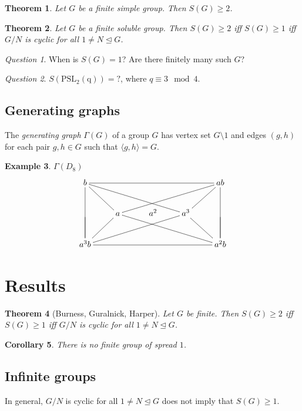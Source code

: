 \documentclass[svgnames]{article}
\newtheorem{Theorem}{Theorem}
\newtheorem{Corollary}[Theorem]{Corollary}
\theoremstyle{definition}
\newtheorem{Example}[Theorem]{Example}
\theoremstyle{remark}
\newtheorem{Question}{Question}
\begin{document}
\begin{Theorem}
Let $G$ be a finite simple group. Then $S(G) \ge 2$.
\end{Theorem}

\begin{Theorem}
Let $G$ be a finite soluble group. Then $S(G) \ge 2$ iff $S(G) \ge 1$ iff $G/N$ is cyclic for all $1 \ne N \unlhd G$.
\end{Theorem}

\begin{Question}
When is $S(G) = 1$? Are there finitely many such $G$?
\end{Question}

\begin{Question}
$S(\operatorname{PSL_2(q)}) = ?$, where $q \equiv 3 \mod 4$.
\end{Question}

\subsection{Generating graphs}
The \emph{generating graph} $\Gamma(G)$ of a group $G$ has vertex set $G\setminus1$ and edges $(g, h)$ for each pair $g, h \in G$ such that $\langle g, h \rangle = G$.
\begin{Example}$\Gamma(D_8)$
\begin{equation*}
\xymatrix{
	b \ar@{-}[dd] \ar@{-}[rd] \ar@{-}[rrrd] \ar@{-}[rrrr] 
		&&&& ab \ar@{-}[llld] \ar@{-}[ld] \ar@{-}[dd]\\
	& a & \phantom{a}a^2 & a^3 & \\
	a^3b \ar@{-}[u] \ar@{-}[ru] \ar@{-}[rrru] \ar@{-}[rrrr]
		&&&& a^2b \ar@{-}[lllu] \ar@{-}[lu] \ar@{-}[u]	
}
\end{equation*}
\end{Example}

\section{Results}
\begin{Theorem}[Burness, Guralnick, Harper]
Let $G$ be finite. Then $S(G) \ge 2$ iff $S(G) \ge 1$ iff $G/N$ is cyclic for all $1 \ne N \unlhd G$.
\end{Theorem}
\begin{Corollary}
There is no finite group of spread $1$.
\end{Corollary}

\subsection{Infinite groups}
In general, $G/N$ is cyclic for all $1 \ne N \unlhd G$ does not imply that $S(G) \ge 1$.
\end{document}
